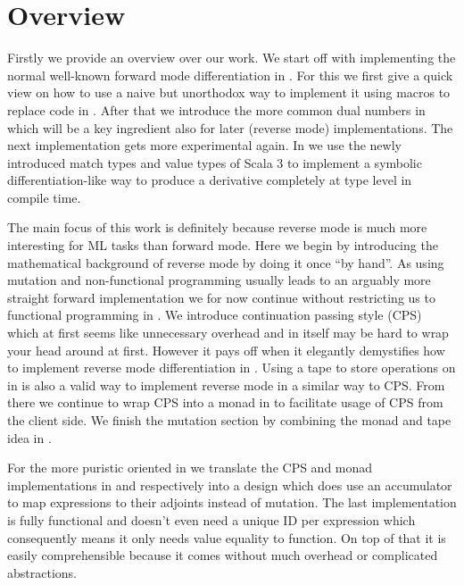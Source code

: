 \section{Overview}
Firstly we provide an overview over our work. We start off with implementing the normal well-known forward mode differentiation in . For this we first give a quick view on how to use a naive but unorthodox way to implement it using macros to replace code in . After that we introduce the more common dual numbers in  which will be a key ingredient also for later (reverse mode) implementations. The next implementation gets more experimental again. In  we use the newly introduced match types and value types of Scala 3 to implement a symbolic differentiation-like way to produce a derivative completely at type level in compile time.

The main focus of this work is definitely  because reverse mode is much more interesting for ML tasks than forward mode. Here we begin by introducing the mathematical background of reverse mode by doing it once ``by hand''. As using mutation and non-functional programming usually leads to an arguably more straight forward implementation we for now continue without restricting us to functional programming in . We introduce continuation passing style (CPS) which at first seems like unnecessary overhead and in itself may be hard to wrap your head around at first. However it pays off when it elegantly demystifies how to implement reverse mode differentiation in . Using a tape to store operations on in  is also a valid way to implement reverse mode in a similar way to CPS. From there we continue to wrap CPS into a monad in  to facilitate usage of CPS from the client side. We finish the mutation section by combining the monad and tape idea in .

For the more puristic oriented in  we translate the CPS and monad implementations in  and  respectively into a design which does use an accumulator to map expressions to their adjoints instead of mutation. The last implementation  is fully functional and doesn't even need a unique ID per expression which consequently means it only needs value equality to function. On top of that it is easily comprehensible because it comes without much overhead or complicated abstractions.

